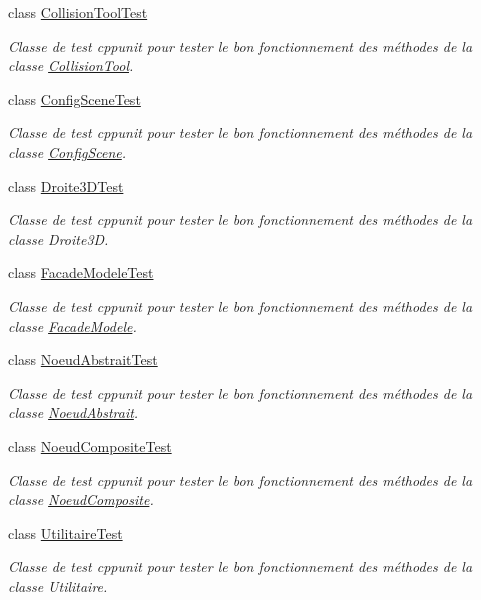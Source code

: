 \begin{DoxyCompactItemize}
class \hyperlink{class_collision_tool_test}{Collision\-Tool\-Test}
\begin{DoxyCompactList}\small\item\em Classe de test cppunit pour tester le bon fonctionnement des méthodes de la classe \hyperlink{class_collision_tool}{Collision\-Tool}. \end{DoxyCompactList}\item 
class \hyperlink{class_config_scene_test}{Config\-Scene\-Test}
\begin{DoxyCompactList}\small\item\em Classe de test cppunit pour tester le bon fonctionnement des méthodes de la classe \hyperlink{class_config_scene}{Config\-Scene}. \end{DoxyCompactList}\item 
class \hyperlink{class_droite3_d_test}{Droite3\-D\-Test}
\begin{DoxyCompactList}\small\item\em Classe de test cppunit pour tester le bon fonctionnement des méthodes de la classe Droite3\-D. \end{DoxyCompactList}\item 
class \hyperlink{class_facade_modele_test}{Facade\-Modele\-Test}
\begin{DoxyCompactList}\small\item\em Classe de test cppunit pour tester le bon fonctionnement des méthodes de la classe \hyperlink{class_facade_modele}{Facade\-Modele}. \end{DoxyCompactList}\item 
class \hyperlink{class_noeud_abstrait_test}{Noeud\-Abstrait\-Test}
\begin{DoxyCompactList}\small\item\em Classe de test cppunit pour tester le bon fonctionnement des méthodes de la classe \hyperlink{class_noeud_abstrait}{Noeud\-Abstrait}. \end{DoxyCompactList}\item 
class \hyperlink{class_noeud_composite_test}{Noeud\-Composite\-Test}
\begin{DoxyCompactList}\small\item\em Classe de test cppunit pour tester le bon fonctionnement des méthodes de la classe \hyperlink{class_noeud_composite}{Noeud\-Composite}. \end{DoxyCompactList}\item 
class \hyperlink{class_utilitaire_test}{Utilitaire\-Test}
\begin{DoxyCompactList}\small\item\em Classe de test cppunit pour tester le bon fonctionnement des méthodes de la classe Utilitaire. \end{DoxyCompactList}\end{DoxyCompactItemize}
